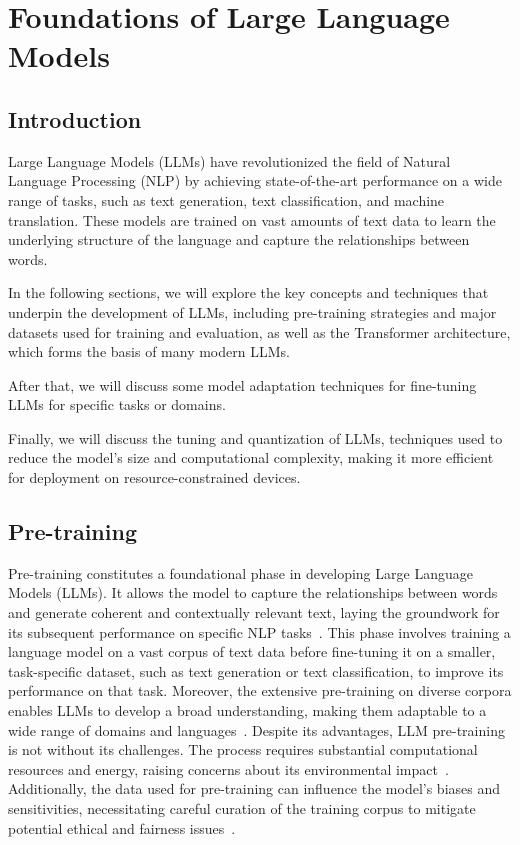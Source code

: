 
\chapter{Foundations of Large Language Models}
\label{ch:foundations-of-large-language-models}

\section{Introduction}
\label{sec:ch2-introduction}

Large Language Models (LLMs) have revolutionized the field of Natural Language Processing (NLP) by achieving state-of-the-art performance on a wide range of tasks, such as text generation, text classification, and machine translation.
These models are trained on vast amounts of text data to learn the underlying structure of the language and capture the relationships between words.

In the following sections, we will explore the key concepts and techniques that underpin the development of LLMs, including pre-training strategies and major datasets used for training and evaluation, as well as the Transformer architecture, which forms the basis of many modern LLMs.

After that, we will discuss some model adaptation techniques for fine-tuning LLMs for specific tasks or domains.

Finally, we will discuss the tuning and quantization of LLMs, techniques used to reduce the model's size and computational complexity, making it more efficient for deployment on resource-constrained devices.

\section{Pre-training}
\label{sec:pre-training}

Pre-training constitutes a foundational phase in developing Large Language Models (LLMs).
It allows the model to capture the relationships between words and generate coherent and contextually relevant text, laying the groundwork for its subsequent performance on specific NLP tasks~\cite{devlin2019bert, brown2020language}.
This phase involves training a language model on a vast corpus of text data before fine-tuning it on a smaller, task-specific dataset, such as text generation or text classification, to improve its performance on that task.
Moreover, the extensive pre-training on diverse corpora enables LLMs to develop a broad understanding, making them adaptable to a wide range of domains and languages~\cite{liu2019roberta, radford2019language}.
Despite its advantages, LLM pre-training is not without its challenges.
The process requires substantial computational resources and energy, raising concerns about its environmental impact~\cite{strubell2019energy}.
Additionally, the data used for pre-training can influence the model's biases and sensitivities, necessitating careful curation of the training corpus to mitigate potential ethical and fairness issues~\cite{bender2021dangers}.

